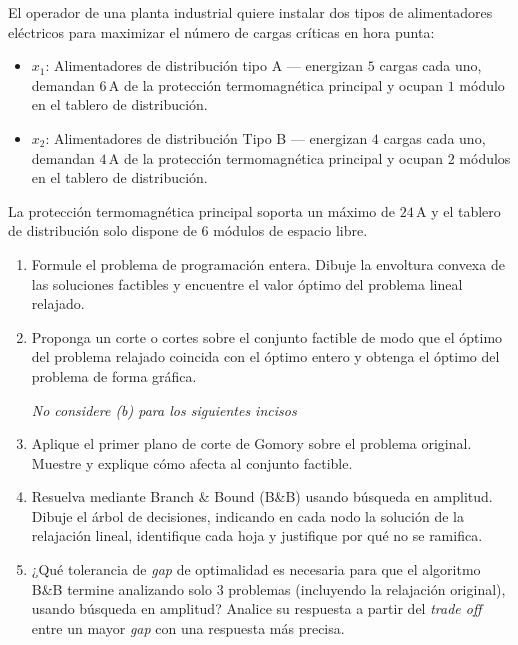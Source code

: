 El operador de una planta industrial quiere instalar dos tipos de alimentadores
eléctricos para maximizar el número de cargas críticas en hora punta:

\begin{itemize}[nosep]
  \item $x_1$: Alimentadores de distribución tipo A --- energizan $5$ cargas cada uno, demandan $6$\,A de la protección termomagnética principal y ocupan $1$ módulo en el tablero de distribución.
  \item $x_2$: Alimentadores de distribución Tipo B --- energizan $4$ cargas cada uno, demandan $4$\,A de la protección termomagnética principal y ocupan $2$ módulos en el tablero de distribución.
\end{itemize}

La protección termomagnética principal soporta un máximo de $24$\,A y el tablero de distribución solo dispone de $6$ módulos de espacio libre.
 
\begin{enumerate}[label=(\alph*)]
  \item Formule el problema de programación entera. Dibuje la envoltura convexa de las soluciones factibles y encuentre el valor
  óptimo del problema lineal relajado.
  
  \item Proponga un corte o cortes sobre el conjunto factible de modo que el óptimo del problema relajado coincida con el óptimo entero y obtenga el óptimo del problema de forma gráfica.
  
  \textit{No considere (b) para los siguientes incisos}
        
  \item Aplique el primer plano de corte de Gomory sobre el problema original. Muestre y explique cómo afecta al conjunto factible.
  
  \item Resuelva mediante Branch \& Bound (B\&B) usando búsqueda en amplitud. Dibuje el
   árbol de decisiones, indicando en cada nodo la solución de la relajación lineal,
   identifique cada hoja y justifique por qué no se ramifica.
  \item ¿Qué tolerancia de \emph{gap} de optimalidad es necesaria  para que el algoritmo B\&B termine analizando solo $3$ problemas (incluyendo la relajación original), usando búsqueda en amplitud? Analice su respuesta a partir del \textit{trade off} entre un mayor \textit{gap} con una respuesta más precisa.
\end{enumerate}
